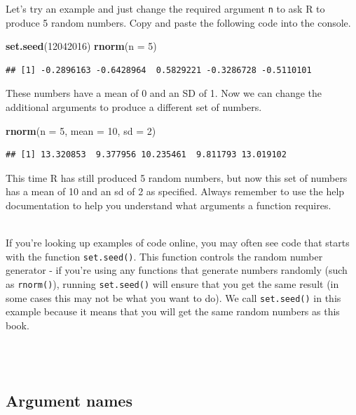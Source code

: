\documentclass[]{book}
\newenvironment{Shaded}{\begin{snugshade}}{\end{snugshade}}
\newcommand{\DataTypeTok}[1]{\textcolor[rgb]{0.13,0.29,0.53}{#1}}
\newcommand{\DecValTok}[1]{\textcolor[rgb]{0.00,0.00,0.81}{#1}}
\newcommand{\KeywordTok}[1]{\textcolor[rgb]{0.13,0.29,0.53}{\textbf{#1}}}
\newcommand{\NormalTok}[1]{#1}
\newenvironment{info}
    {
    \hline\\
    }
    { 
    \\\\\hline
    }
\begin{document}
Let's try an example and just change the required argument \texttt{n} to ask R to produce 5 random numbers. Copy and paste the following code into the console.

\begin{Shaded}
\begin{Highlighting}[]
\KeywordTok{set.seed}\NormalTok{(}\DecValTok{12042016}\NormalTok{)}
\KeywordTok{rnorm}\NormalTok{(}\DataTypeTok{n =} \DecValTok{5}\NormalTok{)}
\end{Highlighting}
\end{Shaded}

\begin{verbatim}
## [1] -0.2896163 -0.6428964  0.5829221 -0.3286728 -0.5110101
\end{verbatim}

These numbers have a mean of 0 and an SD of 1. Now we can change the additional arguments to produce a different set of numbers.

\begin{Shaded}
\begin{Highlighting}[]
\KeywordTok{rnorm}\NormalTok{(}\DataTypeTok{n =} \DecValTok{5}\NormalTok{, }\DataTypeTok{mean =} \DecValTok{10}\NormalTok{, }\DataTypeTok{sd =} \DecValTok{2}\NormalTok{)}
\end{Highlighting}
\end{Shaded}

\begin{verbatim}
## [1] 13.320853  9.377956 10.235461  9.811793 13.019102
\end{verbatim}

This time R has still produced 5 random numbers, but now this set of numbers has a mean of 10 and an sd of 2 as specified. Always remember to use the help documentation to help you understand what arguments a function requires.

\begin{info}
If you're looking up examples of code online, you may often see code
that starts with the function \texttt{set.seed()}. This function
controls the random number generator - if you're using any functions
that generate numbers randomly (such as \texttt{rnorm()}), running
\texttt{set.seed()} will ensure that you get the same result (in some
cases this may not be what you want to do). We call \texttt{set.seed()}
in this example because it means that you will get the same random
numbers as this book.
\end{info}

\hypertarget{argument-names}{%
\subsection{Argument names}\label{argument-names}}
\end{document}
